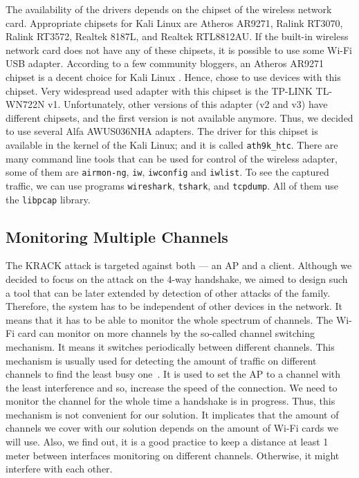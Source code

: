 The availability of the drivers depends on the chipset of the wireless network card. Appropriate chipsets for Kali Linux are Atheros AR9271, Ralink RT3070, Ralink RT3572, Realtek 8187L, and Realtek RTL8812AU. If the built-in wireless network card does not have any of these chipsets, it is possible to use some Wi-Fi USB adapter. According to a few community bloggers, an Atheros AR9271 chipset is a decent choice for Kali Linux \cite{wirelesshack_2018, kaliChipsetDrivers_2018}. Hence, chose to use devices with this chipset. Very widespread used adapter with this chipset is the TP-LINK TL-WN722N v1. Unfortunately, other versions of this adapter (v2 and v3) have different chipsets, and the first version is not available anymore. Thus, we decided to use several Alfa AWUS036NHA adapters. The driver for this chipset is available in the kernel of the Kali Linux; and it is called \texttt{ath9k\_htc}. There are many command line tools that can be used for control of the wireless adapter, some of them are \texttt{airmon-ng}, \texttt{iw}, \texttt{iwconfig} and \texttt{iwlist}. 
To see the captured traffic, we can use programs \texttt{wireshark}, \texttt{tshark}, and \texttt{tcpdump}. All of them use the \texttt{libpcap} library. 

\subsection{Monitoring Multiple Channels}
The KRACK attack is targeted against both --- an AP and a client. Although we decided to focus on the attack on the 4-way handshake, we aimed to design such a tool that can be later extended by detection of other attacks of the family. Therefore, the system has to be independent of other devices in the network. It means that it has to be able to monitor the whole spectrum of channels. 
The Wi-Fi card can monitor on more channels by the so-called channel switching mechanism. It means it switches periodically between different channels. This mechanism is usually used for detecting the amount of traffic on different channels to find the least busy one~\cite{nirsoft_2014, tamosoft, levshova_2015, netspotapp_software_2019}. It is used to set the AP to a channel with the least interference and so, increase the speed of the connection. We need to monitor the channel for the whole time a handshake is in progress. Thus, this mechanism is not convenient for our solution. It implicates that the amount of channels we cover with our solution depends on the amount of Wi-Fi cards we will use. Also, we find out, it is a good practice to keep a distance at least 1 meter between interfaces monitoring on different channels. Otherwise, it might interfere with each other.

